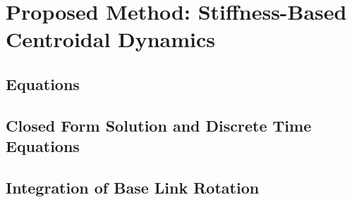 \documentclass[main.tex]{subfiles}
\begin{document}
\section{Proposed Method: Stiffness-Based Centroidal Dynamics}\label{sec:proposedmethods}

\subsection{Equations}
\subsection{Closed Form Solution and Discrete Time Equations}
\subsection{Integration of Base Link Rotation}
\end{document}
